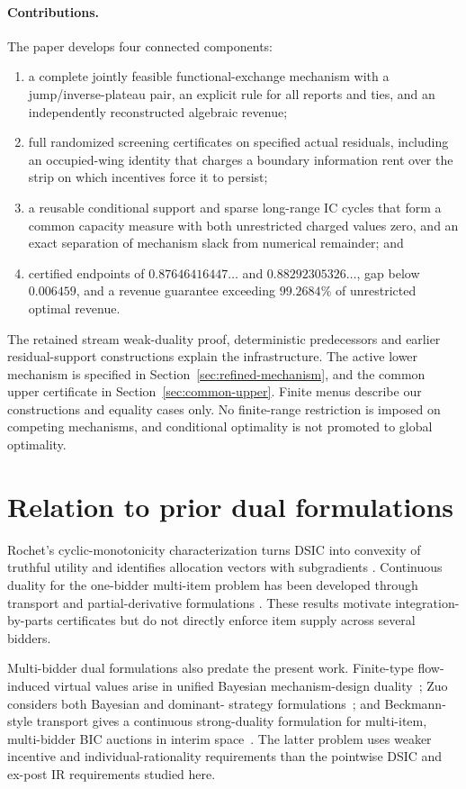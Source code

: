 \documentclass[11pt]{article}
\begin{document}
\paragraph{Contributions.}
The paper develops four connected components:
\begin{enumerate}
\item a complete jointly feasible functional-exchange mechanism with a
jump/inverse-plateau pair, an explicit rule for all reports and ties, and
an independently reconstructed algebraic revenue;
\item full randomized screening certificates on specified actual residuals,
including an occupied-wing identity that charges a boundary information rent
over the strip on which incentives force it to persist;
\item a reusable conditional support and sparse long-range IC cycles that
form a common capacity measure with both unrestricted charged values zero,
and an exact separation of mechanism slack from numerical remainder; and
\item certified endpoints of $0.87646416447\ldots$ and
$0.88292305326\ldots$, gap below $0.006459$, and a revenue guarantee
exceeding $99.2684\%$ of unrestricted optimal revenue.
\end{enumerate}
The retained stream weak-duality proof, deterministic predecessors and earlier
residual-support constructions explain the infrastructure. The active lower
mechanism is specified in Section~\ref{sec:refined-mechanism}, and the common
upper certificate in Section~\ref{sec:common-upper}. Finite menus describe
our constructions and equality cases only. No finite-range restriction is
imposed on competing mechanisms, and conditional optimality is not promoted
to global optimality.

\section{Relation to prior dual formulations}

Rochet's cyclic-monotonicity characterization turns DSIC into convexity of
truthful utility and identifies allocation vectors with subgradients
\citep{rochet1987}.  Continuous duality for the one-bidder multi-item problem
has been developed through transport and partial-derivative formulations
\citep{daskalakis2017strong,giannakopoulos2018duality}.  These results motivate
integration-by-parts certificates but do not directly enforce item supply
across several bidders.

Multi-bidder dual formulations also predate the present work.  Finite-type
flow-induced virtual values arise in unified Bayesian mechanism-design
duality~\citep{cai2018duality}; Zuo considers both Bayesian and dominant-
strategy formulations~\citep{zuo2017}; and Beckmann-style transport gives a
continuous strong-duality formulation for multi-item, multi-bidder BIC
auctions in interim space~\citep{kolesnikov2022beckmann}.  The latter problem
uses weaker incentive and individual-rationality requirements than the
pointwise DSIC and ex-post IR requirements studied here.
\end{document}
